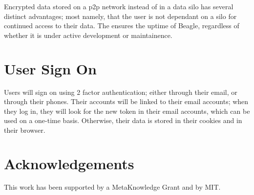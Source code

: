 \documentclass{sig-alternate}
\begin{document}

Encrypted data stored on a p2p network instead of in a data silo has several
distinct advantages; most namely, that the user is not dependant on a silo for
continued access to their data. The ensures the uptime of Beagle, regardless of
whether it is under active development or maintainence.

\section{User Sign On}

Users will sign on using 2 factor authentication; either through their email, or
through their phones. Their accounts will be linked to their email accounts; when
they log in, they will look for the new token in their email accounts, which can
be used on a one-time basis. Otherwise, their data is stored in their cookies
and in their browser.


\section{Acknowledgements}

This work has been supported by a MetaKnowledge Grant and by MIT.

%
%
\end{document}
